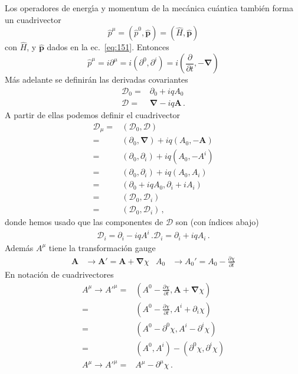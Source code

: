 Los operadores de energ\'\i a y momentum de la mec\'anica cu\'antica tambi\'en forma un cuadrivector
\begin{equation}
  \hat p^\mu=({\hat p}^0,\hat{\mathbf{p}})=(\widehat H,\hat{\mathbf{p}})
\end{equation}
con $\widehat H$, y $\hat{\mathbf{p}}$ dados en la ec.~\eqref{eq:151}. Entonces
\begin{equation}
  \label{eq:cv_hatpmu}
  \hat{p}^\mu=i\partial^\mu=i(\partial^0,\partial^i)=i(\frac{\partial}{\partial t},-\boldsymbol{\nabla})
\end{equation}
Más adelante se definirán las derivadas  covariantes
\begin{align}
   \mathcal{D}_0=&\partial_0+i q A_0\nonumber\\
  \boldsymbol{\mathcal{D}}=&\boldsymbol{\nabla}-i q \mathbf{A}\,.
\end{align}
A partir de ellas podemos definir el cuadrivector
\begin{align}
  \mathcal{D}_\mu=&(\mathcal{D}_0,\boldsymbol{\mathcal{D}})\nonumber\\
=&(\partial_0,\boldsymbol{\nabla})+i q(A_0,-\mathbf{A})\nonumber\\
=&(\partial_0,\partial_i)+i q(A_0,-A^i)\nonumber\\
=&(\partial_0,\partial_i)+i q(A_0,A_i)\nonumber\\
=&(\partial_0+i q A_0,\partial_i+i A_i)\nonumber\\
=&(\mathcal{D}_0,\mathcal{D}_i)\nonumber\\
=&(\mathcal{D}_0,\mathcal{D}_i)\,,
\end{align}
donde hemos usado que las componentes de $\mathcal{D}$ son (con índices abajo)
\begin{align}
\mathcal{D}_i=\partial_i-i q A^i\,.
  \mathcal{D}_i=\partial_i+i q A_i\,.
\end{align}
Adem\'as $A^\mu$ tiene la transformaci\'on gauge
\begin{align}
  \mathbf{A}&\to\mathbf{A}'=\mathbf{A}+\boldsymbol{\nabla}\chi&
  A_0&\to A_0'=A_0-\frac{\partial\chi}{\partial t} 
\end{align}
En notaci\'on de cuadrivectores
\begin{align}
\label{eq:166qft}
  A^\mu\to {A'}^\mu=&\left(A^0-\frac{\partial\chi}{\partial t},\mathbf{A}+\boldsymbol{\nabla}\chi
  \right)\nonumber\\
  =&\left(A^0-\frac{\partial\chi}{\partial t},A^{i}+\partial_i\chi
  \right)\nonumber\\
  =&\left(A^0-\partial^0\chi,A^{i}-\partial^{i}\chi
  \right)\nonumber\\
  =&\left(A^0,A^{i}
  \right)-
  \left(
    \partial^0\chi,\partial^{i}\chi
  \right)\nonumber\\
  A^\mu\to {A'}^\mu=&A^\mu-\partial^\mu\chi\,.
\end{align}

